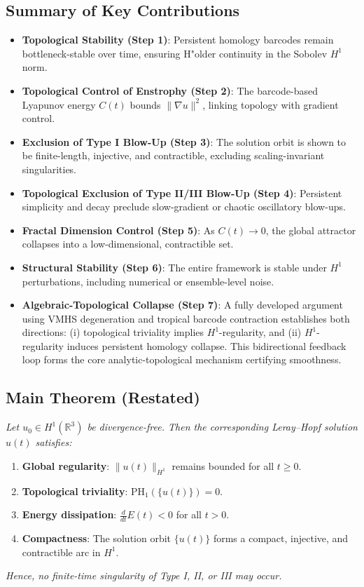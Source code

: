 \documentclass[11pt]{article}
\theoremstyle{definition}
\begin{document}
\subsection*{Summary of Key Contributions}

\begin{itemize}
    \item \textbf{Topological Stability (Step 1)}: Persistent homology barcodes remain bottleneck-stable over time, ensuring H"older continuity in the Sobolev $H^1$ norm.
    \item \textbf{Topological Control of Enstrophy (Step 2)}: The barcode-based Lyapunov energy $C(t)$ bounds $\|\nabla u\|^2$, linking topology with gradient control.
    \item \textbf{Exclusion of Type I Blow-Up (Step 3)}: The solution orbit is shown to be finite-length, injective, and contractible, excluding scaling-invariant singularities.
    \item \textbf{Topological Exclusion of Type II/III Blow-Up (Step 4)}: Persistent simplicity and decay preclude slow-gradient or chaotic oscillatory blow-ups.
    \item \textbf{Fractal Dimension Control (Step 5)}: As $C(t) \to 0$, the global attractor collapses into a low-dimensional, contractible set.
    \item \textbf{Structural Stability (Step 6)}: The entire framework is stable under $H^1$ perturbations, including numerical or ensemble-level noise.
    \item \textbf{Algebraic-Topological Collapse (Step 7)}: A fully developed argument using VMHS degeneration and tropical barcode contraction establishes both directions: (i) topological triviality implies $H^1$-regularity, and (ii) $H^1$-regularity induces persistent homology collapse. This bidirectional feedback loop forms the core analytic-topological mechanism certifying smoothness.
\end{itemize}

\subsection*{Main Theorem (Restated)}

\textit{Let $u_0 \in H^1(\mathbb{R}^3)$ be divergence-free. Then the corresponding Leray--Hopf solution $u(t)$ satisfies:}
\begin{enumerate}
    \item \textbf{Global regularity}: $\|u(t)\|_{H^1}$ remains bounded for all $t \geq 0$.
    \item \textbf{Topological triviality}: $\mathrm{PH}_1(\{u(t)\}) = 0$.
    \item \textbf{Energy dissipation}: $\frac{d}{dt} E(t) < 0$ for all $t > 0$.
    \item \textbf{Compactness}: The solution orbit $\{u(t)\}$ forms a compact, injective, and contractible arc in $H^1$.
\end{enumerate}
\textit{Hence, no finite-time singularity of Type I, II, or III may occur.}
\end{document}
